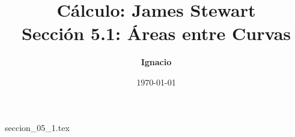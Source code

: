 \documentclass[11pt,spanish,oneside]{report}
\title{\textbf{Cálculo: James Stewart} \\ \Large Sección 5.1: Áreas entre Curvas}
\author{\textbf{Ignacio}}
\date{\today}
\begin{document}
\maketitle

{seccion_05_1.tex}
\end{document}
